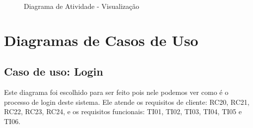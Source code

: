\documentclass[12pt]{article}
\begin{document}
  \begin{figure}[!htb]
    \caption{\label{fig:diagVisualizaInci} Diagrama de Atividade - Visualização}
  \end{figure}

\vfill%
\pagebreak%

\section{Diagramas de Casos de Uso}

\subsection{Caso de uso: Login}
Este diagrama foi escolhido para ser feito pois nele podemos ver como é o processo de login deste sistema. Ele atende os requisitos de cliente: RC20, RC21, RC22, RC23, RC24, e os requisitos funcionais: TI01, TI02, TI03, TI04, TI05 e TI06.
\end{document}

